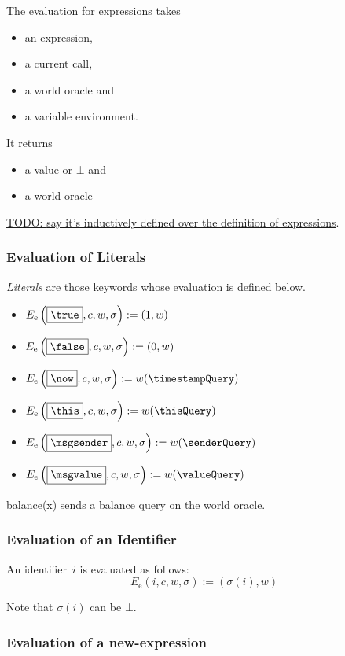 \documentclass{book}
\newcommand{\todo}[1]{\underline{TODO: {#1}}}
\newcommand{\evalE}[1]{E_\mathrm{e}\left({#1}\right)}
\begin{document}
The evaluation for expressions takes
\begin{itemize}
\item an expression,
\item a current call,
\item a world oracle and
\item a variable environment.
\end{itemize}
It returns
\begin{itemize}
\item a value or $\bot$ and
\item a world oracle
\end{itemize}



\todo{say it's inductively defined over the definition of expressions}.

\subsubsection{Evaluation of Literals}

\textit{Literals} are those keywords whose evaluation is defined below.

\begin{itemize}
  \item $\evalE{\boxed{\true}, c, w, \sigma} := (1, w)$
  \item $\evalE{\boxed{\false}, c, w, \sigma} := (0, w)$
  \item $\evalE{\boxed{\now}, c, w, \sigma} := w(\timestampQuery)$
  \item $\evalE{\boxed{\this}, c, w, \sigma} := w(\thisQuery)$
  \item $\evalE{\boxed{\msgsender}, c, w, \sigma} := w(\senderQuery)$
  \item $\evalE{\boxed{\msgvalue}, c, w, \sigma} := w(\valueQuery)$
\end{itemize}

balance(x) sends a balance query on the world oracle.

\subsubsection{Evaluation of an Identifier}

An identifier~$i$ is evaluated as follows:
\[
\evalE{\boxed{i}, c, w, \sigma} := (\sigma(i), w)
\]

Note that $\sigma(i)$ can be $\bot$.

\subsubsection{Evaluation of a new-expression}
\end{document}
